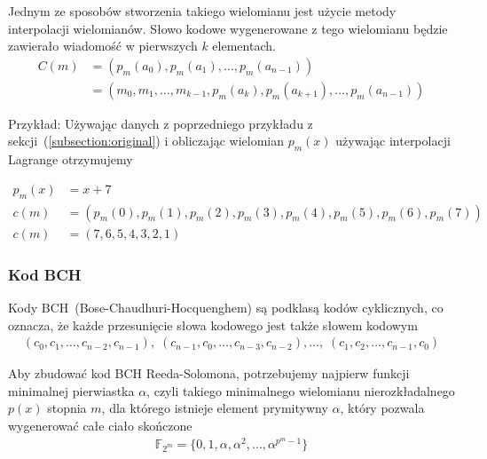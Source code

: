 Jednym ze sposobów stworzenia takiego wielomianu jest użycie metody interpolacji
wielomianów. Słowo kodowe wygenerowane z tego wielomianu będzie zawierało wiadomość
w pierwszych $k$ elementach.
\begin{align*}
    C(m) &= (p_m(a_0), p_m(a_1), \ldots, p_m(a_{n-1})) \\
         &= (m_0, m_1, \ldots, m_{k-1}, p_m(a_k), p_m(a_{k+1}), \ldots, p_m(a_{n-1}))
\end{align*}
\begin{minipage}{\textwidth}
Przykład:
\newline
Używając danych z poprzedniego przykładu z sekcji~(\ref{subsection:original}) i
obliczając wielomian $p_m(x)$ używając interpolacji Lagrange otrzymujemy
\end{minipage}
\begin{align*}
    p_m(x) &= x + 7 \\
    c(m) &= (p_m(0), p_m(1), p_m(2), p_m(3), p_m(4), p_m(5), p_m(6), p_m(7)) \\
    c(m) &= (7, 6, 5, 4, 3, 2, 1)
\end{align*}

\subsubsection{Kod BCH}\label{subsubsection:bch}

Kody BCH~(Bose-Chaudhuri-Hocquenghem) są podklasą kodów cyklicznych, co oznacza, że każde przesunięcie słowa kodowego jest także słowem kodowym
\begin{align*}
    (c_0, c_1,\ldots, c_{n-2}, c_{n-1}), \;
    (c_{n-1}, c_0, \ldots, c_{n-3}, c_{n-2}),\ldots, \;
    (c_1, c_2, \ldots, c_{n-1}, c_{0})
\end{align*}

Aby zbudować kod BCH Reeda-Solomona, potrzebujemy najpierw funkcji minimalnej pierwiastka $\alpha$, czyli takiego minimalnego wielomianu nierozkładalnego $p(x)$ stopnia $m$, dla którego istnieje element prymitywny $\alpha$, który pozwala wygenerować całe ciało skończone
\begin{align*}
    \mathbb{F}_{2^m} = \{0, 1, \alpha, \alpha^2, \ldots, \alpha^{p^{m}-1} \}
\end{align*}

